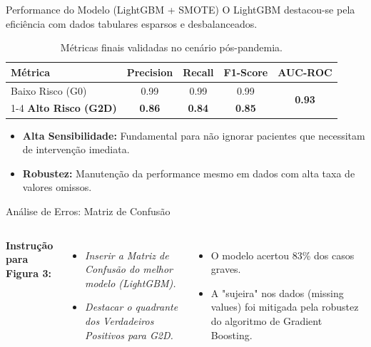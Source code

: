 \documentclass[10pt, aspectratio=169]{beamer}
\begin{document}
\begin{frame}{Performance do Modelo (LightGBM + SMOTE)}
    O LightGBM destacou-se pela eficiência com dados tabulares esparsos e desbalanceados.

    \begin{table}[ht]
    \centering
    \footnotesize
    \begin{tabular}{|l|c|c|c|c|}
    \hline
    \textbf{Métrica} & \textbf{Precision} & \textbf{Recall} & \textbf{F1-Score} & \textbf{AUC-ROC} \\ \hline
    Baixo Risco (G0) & 0.99 & 0.99 & 0.99 & \multirow{2}{*}{\textbf{0.93}} \\ \cline{1-4}
    \textbf{Alto Risco (G2D)} & \textbf{0.86} & \textbf{0.84} & \textbf{0.85} & \\ \hline
    \end{tabular}
    \caption{Métricas finais validadas no cenário pós-pandemia.}
    \end{table}
    
    \begin{itemize}
        \item \textbf{Alta Sensibilidade:} Fundamental para não ignorar pacientes que necessitam de intervenção imediata.
        \item \textbf{Robustez:} Manutenção da performance mesmo em dados com alta taxa de valores omissos.
    \end{itemize}
\end{frame}

\begin{frame}{Análise de Erros: Matriz de Confusão}
    \begin{columns}
        \textbf{Instrução para Figura 3:}
        \begin{itemize}
            \item \textit{Inserir a Matriz de Confusão do melhor modelo (LightGBM).}
            \item \textit{Destacar o quadrante dos Verdadeiros Positivos para G2D.}
        \end{itemize}
        
        \begin{itemize}
            \item O modelo acertou 83\% dos casos graves.
            \item A "sujeira" nos dados (missing values) foi mitigada pela robustez do algoritmo de Gradient Boosting.
        \end{itemize}
    \end{columns}
\end{frame}
\end{document}
